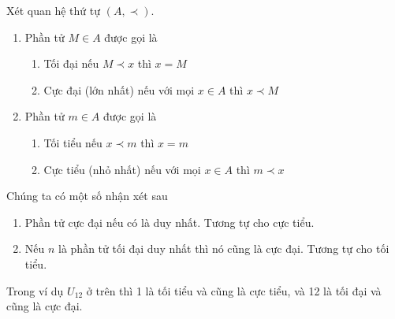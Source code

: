 \begin{definition}
    Xét quan hệ thứ tự $(A, \prec)$.
    \begin{enumerate}
        \item Phần tử $M \in A$ được gọi là
        \begin{enumerate}
            \item Tối đại nếu $M \prec x$ thì $x = M$
            \item Cực đại (lớn nhất) nếu với mọi $x \in A$ thì $x \prec M$
        \end{enumerate}
        \item Phần tử $m \in A$ được gọi là
        \begin{enumerate}
            \item Tối tiểu nếu $x \prec m$ thì $x = m$
            \item Cực tiểu (nhỏ nhất) nếu với mọi $x \in A$ thì $m \prec x$
        \end{enumerate}
    \end{enumerate}
\end{definition}

Chúng ta có một số nhận xét sau

\begin{enumerate}
    \item Phần tử cực đại nếu có là duy nhất. Tương tự cho cực tiểu.
    \item Nếu $n$ là phần tử tối đại duy nhất thì nó cũng là cực đại.
    Tương tự cho tối tiểu.
\end{enumerate}

Trong ví dụ $U_{12}$ ở trên thì 1 là tối tiểu và cũng là cực tiểu, và
12 là tối đại và cũng là cực đại.